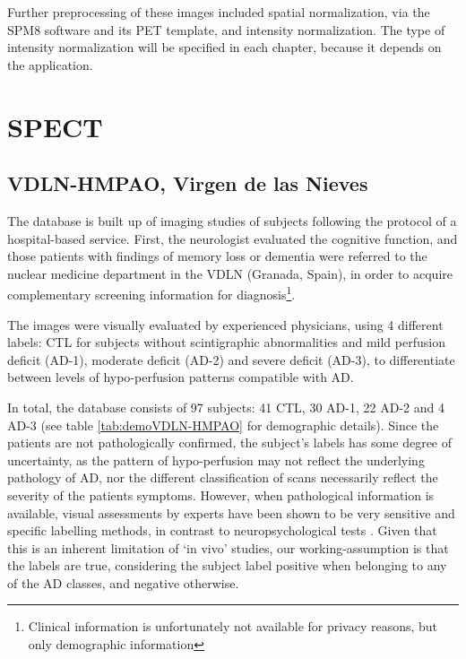 Further preprocessing of these images included spatial normalization, via the SPM8 software and its \ac{PET} template, and intensity normalization. The type of intensity normalization will be specified in each chapter, because it depends on the application. 

\section{\acs{SPECT}}

\subsection{VDLN-HMPAO, Virgen de las Nieves}\label{sec:vdlnhmpao}
The database is built up of imaging studies of subjects following the protocol of a hospital-based service. First, the neurologist evaluated the cognitive function, and those patients with findings of memory loss or dementia were referred to the nuclear medicine department in the \acf{VDLN} (Granada, Spain), in order to acquire complementary screening information for diagnosis\footnote{Clinical information is unfortunately not available for privacy reasons, but only demographic  information}. 

The images were visually evaluated by experienced physicians, using 4 different labels: \ac{CTL} for subjects without scintigraphic abnormalities and mild perfusion deficit (\ac{AD}-1), moderate deficit (\ac{AD}-2) and severe deficit (\ac{AD}-3), to differentiate between levels of hypo-perfusion patterns compatible with \ac{AD}. 

In total, the database consists of 97 subjects: 41 \ac{CTL}, 30 \ac{AD}-1, 22 \ac{AD}-2 and 4 \ac{AD}-3 (see table \ref{tab:demoVDLN-HMPAO} for demographic details). Since the patients are not pathologically confirmed, the subject's labels has some degree of uncertainty, as the pattern of hypo-perfusion may not reflect the underlying pathology of AD, nor the different classification of scans necessarily reflect the severity of the patients symptoms. However, when pathological information is available, visual assessments by experts have been shown to be very sensitive and specific labelling methods, in contrast to neuropsychological tests \cite{jobst_accurate_1998,dougall_systematic_2004}. Given that this is an inherent limitation of `in vivo' studies, our working-assumption is that the labels are true, considering the subject label positive when belonging to any of the \ac{AD} classes, and negative otherwise. 

